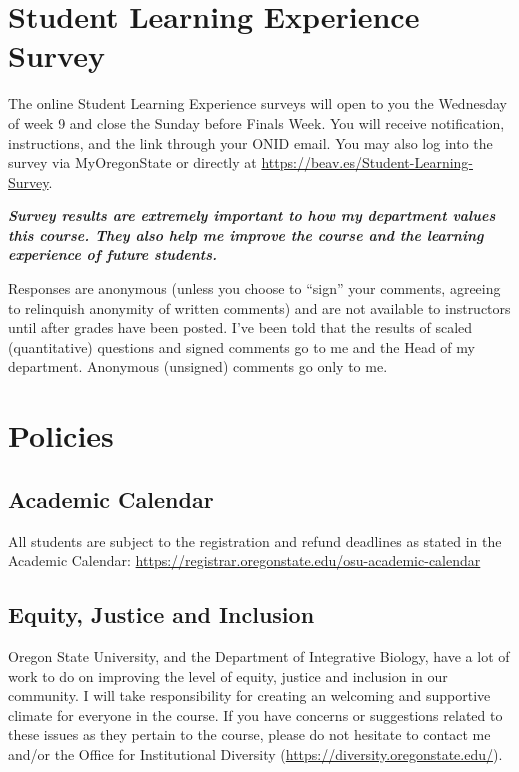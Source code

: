 \documentclass[10pt]{article}
\begin{document}
\section*{Student Learning Experience Survey}
The online Student Learning Experience surveys will open to you the 
Wednesday of week 9 and close the Sunday before Finals Week. 
You will receive notification, instructions, and the link through your ONID email. 
You may also log into the survey via MyOregonState or directly at 
\url{https://beav.es/Student-Learning-Survey}. 

\noindent
\textit{
\textbf{Survey results are extremely important to how my department values 
this course.
They also help me improve the course and the learning experience of future 
students.}}

Responses are anonymous (unless you choose to ``sign'' your comments, 
agreeing to relinquish anonymity of written comments) and are not available to 
instructors until after grades have been posted. 
I've been told that the results of scaled (quantitative) questions and signed 
comments go to me and the Head 
of my department.
Anonymous (unsigned) comments go only to me.



\section*{Policies}
\tiny
\subsection*{Academic Calendar}
All students are subject to the registration and refund deadlines as stated in the Academic Calendar: 
\url{https://registrar.oregonstate.edu/osu-academic-calendar}

\subsection*{Equity, Justice and Inclusion}
Oregon State University, and the Department of Integrative Biology, have a lot 
of work to do on improving the level of equity, justice and inclusion in our 
community. 
I will take responsibility for creating an welcoming and supportive climate for 
everyone in the course. 
If you have concerns or suggestions related to these issues as they pertain to 
the course, please do not hesitate to contact me and/or the Office for 
Institutional Diversity
(\href{https://diversity.oregonstate.edu/}{https://diversity.oregonstate.edu/}).
\end{document}
